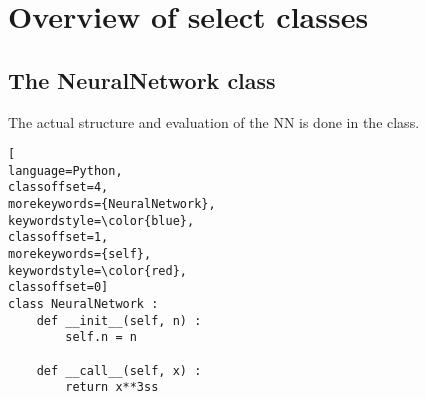 \documentclass[../../master.tex]{subfiles}
\begin{document}
\section{Overview of select classes}
\subsection{The NeuralNetwork class}
The actual structure and evaluation of the NN is done in the  class. 

\begin{lstlisting}[
language=Python,
classoffset=4,
morekeywords={NeuralNetwork},
keywordstyle=\color{blue},
classoffset=1,
morekeywords={self},
keywordstyle=\color{red},
classoffset=0]
class NeuralNetwork :
	def __init__(self, n) :
		self.n = n

	def __call__(self, x) :
		return x**3ss
\end{lstlisting}
\end{document}
